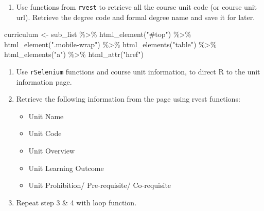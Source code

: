\documentclass[
  letterpaper,
  DIV=11,
  numbers=noendperiod]{scrreport}
\newenvironment{Shaded}{\begin{snugshade}}{\end{snugshade}}
\newcommand{\FunctionTok}[1]{\textcolor[rgb]{0.28,0.35,0.67}{#1}}
\newcommand{\NormalTok}[1]{\textcolor[rgb]{0.00,0.23,0.31}{#1}}
\newcommand{\OtherTok}[1]{\textcolor[rgb]{0.00,0.23,0.31}{#1}}
\newcommand{\SpecialCharTok}[1]{\textcolor[rgb]{0.37,0.37,0.37}{#1}}
\newcommand{\StringTok}[1]{\textcolor[rgb]{0.13,0.47,0.30}{#1}}
\providecommand{\tightlist}{%
  \setlength{\itemsep}{0pt}\setlength{\parskip}{0pt}}\usepackage{longtable,booktabs,array}
\begin{document}
\begin{enumerate}
\def\labelenumi{\arabic{enumi}.}
\setcounter{enumi}{1}
\tightlist
\item
  Use functions from \texttt{rvest} to retrieve all the course unit code
  (or course unit url). Retrieve the degree code and formal degree name
  and save it for later.
\end{enumerate}

\begin{Shaded}
\begin{Highlighting}[]
\NormalTok{curriculum }\OtherTok{\textless{}{-}}\NormalTok{ sub\_list }\SpecialCharTok{\%\textgreater{}\%} 
      \FunctionTok{html\_element}\NormalTok{(}\StringTok{"\#top"}\NormalTok{) }\SpecialCharTok{\%\textgreater{}\%} 
      \FunctionTok{html\_element}\NormalTok{(}\StringTok{".mobile{-}wrap"}\NormalTok{) }\SpecialCharTok{\%\textgreater{}\%} 
      \FunctionTok{html\_elements}\NormalTok{(}\StringTok{"table"}\NormalTok{) }\SpecialCharTok{\%\textgreater{}\%} 
      \FunctionTok{html\_elements}\NormalTok{(}\StringTok{"a"}\NormalTok{) }\SpecialCharTok{\%\textgreater{}\%} 
      \FunctionTok{html\_attr}\NormalTok{(}\StringTok{"href"}\NormalTok{)}
\end{Highlighting}
\end{Shaded}

\begin{enumerate}
\def\labelenumi{\arabic{enumi}.}
\setcounter{enumi}{2}
\item
  Use \texttt{rSelenium} functions and course unit information, to
  direct R to the unit information page.
\item
  Retrieve the following information from the page using rvest
  functions:

  \begin{itemize}
  \tightlist
  \item
    Unit Name
  \item
    Unit Code
  \item
    Unit Overview
  \item
    Unit Learning Outcome
  \item
    Unit Prohibition/ Pre-requisite/ Co-requisite
  \end{itemize}
\item
  Repeat step 3 \& 4 with loop function.
\end{enumerate}
\end{document}
